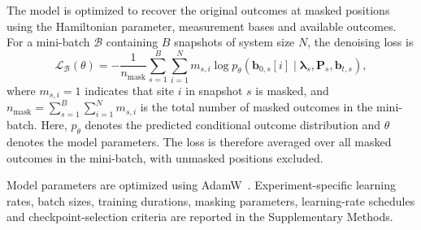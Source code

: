 \documentclass[pdflatex,sn-nature]{sn-jnl}%
\theoremstyle{thmstyleone}%
\theoremstyle{thmstyletwo}%
\theoremstyle{thmstylethree}%
\begin{document}
The model is optimized to recover the original outcomes at masked positions using the Hamiltonian parameter, measurement bases and available outcomes. For a mini-batch \(\mathcal{B}\) containing \(B\) snapshots of system size \(N\), the denoising loss is
\begin{equation}
\label{eq:loss_fun}
\mathcal{L}_{\mathcal{B}}(\theta)
=
-\frac{1}{n_{\mathrm{mask}}}
\sum_{s=1}^{B}
\sum_{i=1}^{N}
m_{s,i}
\log p_{\theta}
\left(
\mathbf{b}_{0,s}[i]
\mid
\boldsymbol{\lambda}_{s},
\mathbf{P}_{s},
\mathbf{b}_{t,s}
\right),
\end{equation}
where \(m_{s,i}=1\) indicates that site \(i\) in snapshot \(s\) is masked, and
\(n_{\mathrm{mask}}=\sum_{s=1}^{B}\sum_{i=1}^{N}m_{s,i}\)
is the total number of masked outcomes in the mini-batch.
Here, \(p_{\theta}\) denotes the predicted conditional outcome distribution and \(\theta\) denotes the model parameters. The loss is therefore averaged over all masked outcomes in the mini-batch, with unmasked positions excluded.

Model parameters are optimized using AdamW~\cite{Loshchilov2017DecoupledWD}. Experiment-specific learning rates, batch sizes, training durations, masking parameters, learning-rate schedules and checkpoint-selection criteria are reported in the Supplementary Methods.



\end{document}
